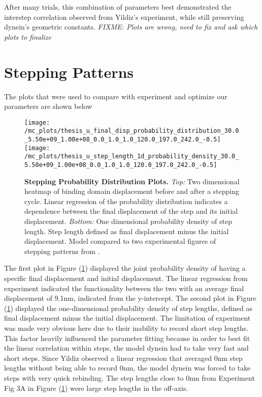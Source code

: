 After many trials, this combination of parameters best demonstrated the interstep correlation observed from Yildiz's experiment, while still preserving dynein's geometric constants. \textit{FIXME: Plots are wrong, need to fix and ask which plots to finalize}


\section{Stepping Patterns}
The plots that were used to compare with experiment and optimize our parameters are shown below
\begin{figure}[H]
	\centering
	\texttt{[image: /mc\_plots/thesis\_u\_final\_disp\_probability\_distribution\_30.0\_5.50e+09\_1.00e+08\_0.0\_1.0\_1.0\_120.0\_197.0\_242.0\_-0.5]}
	\texttt{[image: /mc\_plots/thesis\_u\_step\_length\_1d\_probability\_density\_30.0\_5.50e+09\_1.00e+08\_0.0\_1.0\_1.0\_120.0\_197.0\_242.0\_-0.5]}
	\caption[Final Displacement Probability Distribution]{\textbf{Stepping Probability Distribution Plots.} \textit{Top:} Two dimensional heatmap of binding domain displacement before and after a stepping cycle. Linear regression of the probability distribution indicates a dependence between the final displacement of the step and its initial displacement. \textit{Bottom:} One dimensional probability density of step length. Step length defined as final displacement minus the initial displacement. Model compared to two experimental figures of stepping patterns from \citep{Dewitt2012}.} 
	\label{fig:DataStep}
\end{figure}
The first plot in Figure (\ref{fig:DataStep}) displayed the joint probability density of having a specific final displacement and initial displacement. The linear regression from experiment indicated the functionality between the two with an average final displacement of 9.1nm, indicated from the y-intercept. The second plot in Figure (\ref{fig:DataStep}) displayed the one-dimensional probability density of step lengths, defined as final displacement minus the initial displacement. The limitation of experiment was made very obvious here due to their inability to record short step lengths. This factor heavily influenced the parameter fitting because in order to best fit the linear correlation within steps, the model dynein had to take very fast and short steps. Since Yildiz observed a linear regression that averaged 0nm step lengths without being able to record 0nm, the model dynein was forced to take steps with very quick rebinding. The step lengths close to 0nm from Experiment Fig 3A in Figure (\ref{fig:DataStep}) were large step lengths in the off-axis. 

